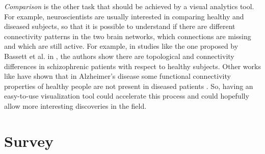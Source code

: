 \documentclass{article}
\begin{document}
\begin{multicols}{2}
\textit{Comparison} is the other task that should be achieved by a visual analytics tool. For example, neuroscientists are usually interested in comparing healthy and diseased subjects, so that it is possible to understand if there are different connectivity patterns in the two brain networks, which connections are missing and which are still active. For example, in studies like the one proposed by Bassett et al. in \cite{hierarchicalOrganization}, the authors show there are topological and connectivity differences in schizophrenic patients with respect to healthy subjects. Other works like \cite{alzheimer} have shown that in Alzheimer's disease some functional connectivity properties of healthy people are not present in diseased patients . So, having an easy-to-use visualization tool could accelerate this process and could hopefully allow more interesting discoveries in the field.




%
%
%				

\section{Survey}
\label{sec:survey}





\end{multicols}
\end{document}
